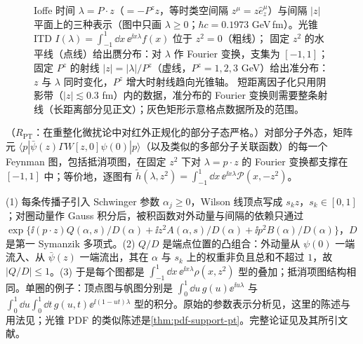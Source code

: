 \begin{figure}[htbp]
\caption{Ioffe 时间 $\lambda=P\cdot z$（$=-P^zz$，等时类空间隔 $z^\mu=z\hat e_z^\mu$）与间隔 $|z|$ 平面上的三种表示（图中只画 $\lambda\ge0$；$\hbar c=0.1973$ GeV\,fm）。光锥 ITD $I(\lambda)=\int_{-1}^1\dd x\,\ee^{\ii x\lambda}f(x)$ 位于 $z^2=0$（粗线）；
固定 $z^2$ 的水平线（点线）给出赝分布：对 $\lambda$ 作 Fourier 变换，支集为 $[-1,1]$；固定 $P^z$ 的射线 $|z|=|\lambda|/P^z$（虚线，$P^z=1,2,3$ GeV）给出准分布：$z$ 与 $\lambda$ 同时变化，$P^z$ 增大时射线趋向光锥轴。
短距离因子化只用阴影带（$|z|\lesssim0.3$ fm）内的数据，准分布的 Fourier 变换则需要整条射线（长距离部分见正文）；灰色矩形示意格点数据所及的范围。}
\label{fig:lamet-ioffe}
\end{figure}
\begin{proposition}\label{prop:lamet-support}
（$R_{\mathrm{PT}}$：在重整化微扰论中对红外正规化的部分子态严格。）对部分子外态，矩阵元 $\langle p|\bar\psi(z)\Gamma W[z,0]\psi(0)|p\rangle$（以及类似的多部分子关联函数）的每一个 Feynman 图，包括抵消项图，在固定 $z^2$ 下对 $\lambda=p\cdot z$ 的 Fourier 变换都支撑在 $[-1,1]$ 中；等价地，逐图有 $\tilde h(\lambda,z^2)=\int_{-1}^1\dd x\,\ee^{\ii x\lambda}\mathcal P(x,-z^2)$。%
\end{proposition}

\begin{proofsketch}
(1) 每条传播子引入 Schwinger 参数 $\alpha_j\ge0$，Wilson 线顶点写成 $s_kz$，$s_k\in[0,1]$；对圈动量作 Gauss 积分后，被积函数对外动量与间隔的依赖只通过 $\exp\{\ii(p\cdot z)Q(\alpha,s)/D(\alpha)+\ii z^2A(\alpha,s)/D(\alpha)+\ii p^2B(\alpha)/D(\alpha)\}$，$D$ 是第一 Symanzik 多项式。(2) $Q/D$ 是端点位置的凸组合：外动量从 $\psi(0)$ 一端流入、从 $\bar\psi(z)$ 一端流出，其在 $\alpha$ 与 $s_k$ 上的权重非负且总和不超过 $1$，故 $|Q/D|\le1$。(3) 于是每个图都是 $\int_{-1}^1\dd x\,\ee^{\ii x\lambda}\rho(x,z^2)$ 型的叠加；抵消项图结构相同。单圈的例子：顶点图与帆图分别是 $\int_0^1\dd u\,g(u)\ee^{\ii u\lambda}$ 与 $\int_0^1\dd u\int_0^1\dd t\,g(u,t)\ee^{\ii(1-ut)\lambda}$ 型的积分\cite[第~III~节]{IzubuchiEtAl2018}。原始的参数表示分析见\cite{Radyushkin:1983wh}，这里的陈述与用法见\cite{Radyushkin2017,Radyushkin:2018cvn,IzubuchiEtAl2018}；光锥 PDF 的类似陈述是\cref{thm:pdf-support-pt}。完整论证见\cite{Radyushkin2017}及其所引文献。
\end{proofsketch}

